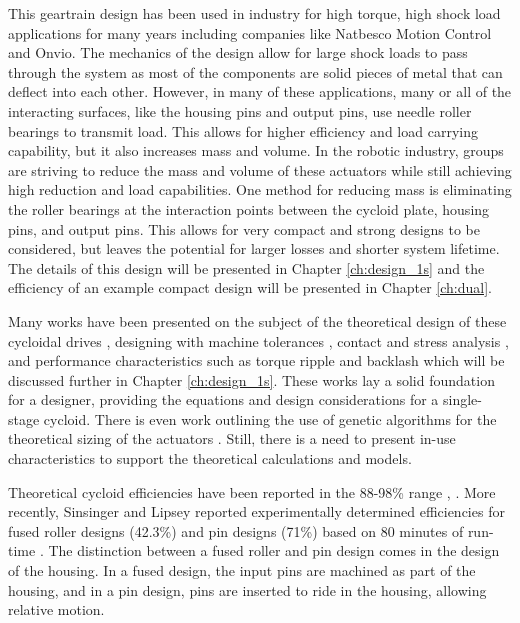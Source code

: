 This geartrain design has been used in industry for high torque, high shock load applications for many years including companies like Natbesco Motion Control and Onvio. The mechanics of the design allow for large shock loads to pass through the system as most of the components are solid pieces of metal that can deflect into each other. 
However, in many of these applications, many or all of the interacting surfaces, like the housing pins and output pins, use needle roller bearings to transmit load.
This allows for higher efficiency and load carrying capability, but it also increases mass and volume.
In the robotic industry, groups are striving to reduce the mass and volume of these actuators while still achieving high reduction and load capabilities.
One method for reducing mass is eliminating the roller bearings at the interaction points between the cycloid plate, housing pins, and output pins.
This allows for very compact and strong designs to be considered, but leaves the potential for larger losses and shorter system lifetime. The details of this design will be presented in Chapter \ref{ch:design_1s} and the efficiency of an example compact design will be presented in Chapter \ref{ch:dual}. 

Many works have been presented on the subject of the theoretical design of these cycloidal drives \cite{ref:on_the_lobe} \cite{ref:hwang_hsieh}, designing with machine tolerances \cite{ref:design_and_application}, contact and stress analysis \cite{ref:li}, and performance characteristics such as torque ripple and backlash \cite{ref:hsieh_traditional} \cite{ref:hsieh_dynamics} which will be discussed further in Chapter \ref{ch:design_1s}.
These works lay a solid foundation for a designer, providing the equations and design considerations for a single-stage cycloid. There is even work outlining the use of genetic algorithms for the theoretical sizing of the actuators \cite{ref:single_genetic}.
Still, there is a need to present in-use characteristics to support the theoretical calculations and models.

Theoretical cycloid efficiencies have been reported in the 88-98\% range \cite{ref:malhorta_2}, \cite{ref:unified_approach}.
More recently, Sinsinger and Lipsey reported experimentally determined efficiencies for fused roller designs (42.3\%) and pin designs (71\%) based on 80 minutes of run-time \cite{ref:cycloid_vs_harmonic}.
The distinction between a fused roller and pin design comes in the design of the housing.
In a fused design, the input pins are machined as part of the housing, and in a pin design, pins are inserted to ride in the housing, allowing relative motion.

